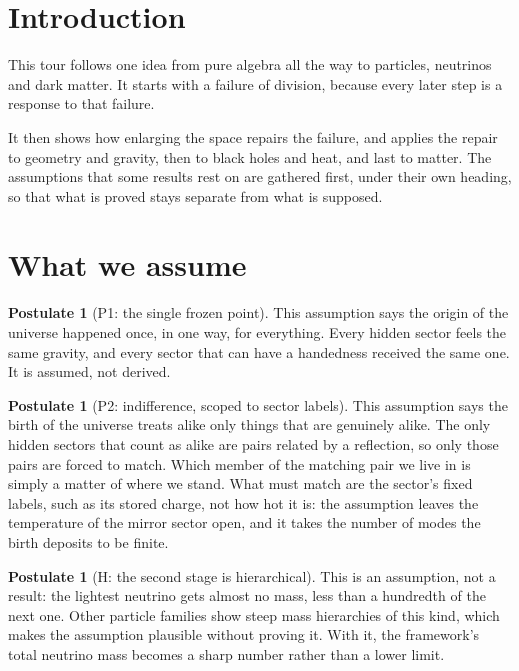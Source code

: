 \documentclass[11pt]{article}
\theoremstyle{definition}
\newtheorem{postulate}[theorem]{Postulate}
\theoremstyle{plain}
\begin{document}
\section*{Introduction}
This tour follows one idea from pure algebra all the way to particles, neutrinos and dark matter. It starts with a failure of division, because every later step is a response to that failure.

It then shows how enlarging the space repairs the failure, and applies the repair to geometry and gravity, then to black holes and heat, and last to matter. The assumptions that some results rest on are gathered first, under their own heading, so that what is proved stays separate from what is supposed.

\section{What we assume}

\begin{postulate}[P1: the single frozen point]\label{c:dark-matter.p1-single-frozen-point}
This assumption says the origin of the universe happened once, in one way, for everything. Every hidden sector feels the same gravity, and every sector that can have a handedness received the same one. It is assumed, not derived.
\end{postulate}

\begin{postulate}[P2: indifference, scoped to sector labels]\label{c:dark-matter.p2-indifference}
This assumption says the birth of the universe treats alike only things that are genuinely alike. The only hidden sectors that count as alike are pairs related by a reflection, so only those pairs are forced to match. Which member of the matching pair we live in is simply a matter of where we stand. What must match are the sector's fixed labels, such as its stored charge, not how hot it is: the assumption leaves the temperature of the mirror sector open, and it takes the number of modes the birth deposits to be finite.
\end{postulate}

\begin{postulate}[H: the second stage is hierarchical]\label{c:neutrino.h-second-stage-hierarchical}
This is an assumption, not a result: the lightest neutrino gets almost no mass, less than a hundredth of the next one. Other particle families show steep mass hierarchies of this kind, which makes the assumption plausible without proving it. With it, the framework's total neutrino mass becomes a sharp number rather than a lower limit.
\end{postulate}
\end{document}
